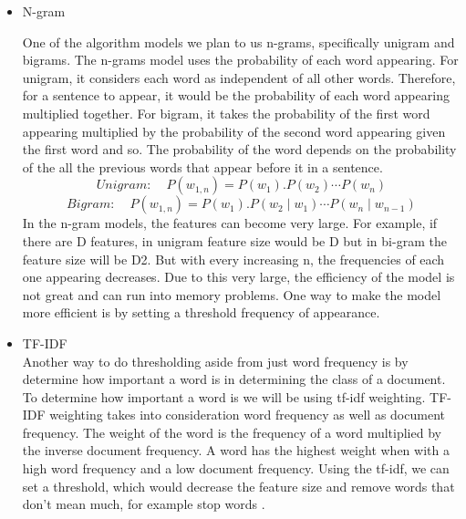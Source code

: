 \documentclass[a4paper, 11pt]{article}
\begin{document}
\begin{itemize}
	\item N-gram
	\par One of the algorithm models we plan to us n-grams, specifically unigram and bigrams.  The n-grams model uses the probability of each word appearing. For unigram, it considers each word as independent of all other words. Therefore, for a sentence to appear, it would be the probability of each word appearing multiplied together. For bigram, it takes the probability of the first word appearing multiplied by the probability of the second word appearing given the first word and so. The probability of the word depends on the probability of the all the previous words that appear before it in a sentence. \cite{song1999general} \\
	\begin{equation}
		\textit{Unigram:}  \hspace{15pt} P(w_{1,n})  = P(w_1).P(w_2) \cdots P(w_n)
	\end{equation}
	\begin{equation}
	\textit{Bigram:}  \hspace{15pt} P(w_{1,n})  = P(w_1).P(w_2 \mid  w_1) \cdots P(w_n \mid w_{n-1})
	\end{equation}
	In the n-gram models, the features can become very large. For example, if there are D features, in unigram feature size would be D but in bi-gram the feature size will be D2. But with every increasing n, the frequencies of each one appearing decreases. Due to this very large, the efficiency of the model is not great and can run into memory problems. One way to make the model more efficient is by setting a threshold frequency of appearance\cite{furnkranz1998study}.  \\
	
	\item TF-IDF\\
	Another way to do thresholding aside from just word frequency is by determine how important a word is in determining the class of a document. To determine how important a word is we will be using tf-idf weighting. TF-IDF weighting takes into consideration word frequency as well as document frequency. The weight of the word is the frequency of a word multiplied by the inverse document frequency. A word has the highest weight when with a high word frequency and a low document frequency. Using the tf-idf, we can set a threshold, which would decrease the feature size and remove words that don’t mean much, for example stop words \cite{schutze2008introduction}.
	
\end{itemize}
\end{document}
